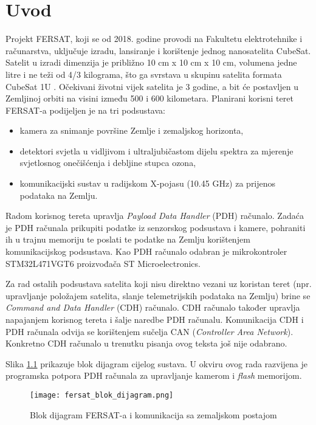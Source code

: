 \chapter{Uvod}
Projekt FERSAT, koji se od 2018. godine provodi na Fakultetu elektrotehnike i računarstva, uključuje izradu, lansiranje i korištenje jednog nanosatelita CubeSat. Satelit u izradi dimenzija je približno 10 cm x 10 cm x 10 cm, volumena jedne litre i ne teži od 4/3 kilograma, što ga svrstava u skupinu satelita formata CubeSat 1U \cite{fersat_stranica_projekta}. Očekivani životni vijek satelita je 3 godine, a bit će postavljen u Zemljinoj orbiti na visini između 500 i 600 kilometara. Planirani korisni teret  FERSAT-a podijeljen je na tri podsustava:

\begin{itemize}
	\item kamera za snimanje površine Zemlje i zemaljskog horizonta,
	\item detektori svjetla u vidljivom i ultraljubičastom dijelu spektra za mjerenje svjetlosnog onečišćenja i debljine stupca ozona,
	\item komunikacijski sustav u radijskom X-pojasu (10.45 GHz) za prijenos podataka na Zemlju.
\end{itemize}

Radom korisnog tereta upravlja \textit{Payload Data Handler} (PDH) računalo. Zadaća je PDH računala prikupiti podatke iz senzorskog podsustava i kamere, pohraniti ih u trajnu memoriju  te poslati te podatke na Zemlju korištenjem komunikacijskog podsustava. Kao PDH računalo odabran je mikrokontroler STM32L471VGT6 proizvođača ST Microelectronics.

Za rad ostalih podsustava satelita koji nisu direktno vezani uz koristan teret (npr. upravljanje položajem satelita, slanje telemetrijskih podataka na Zemlju) brine se \textit{Command and Data Handler} (CDH) računalo. CDH računalo također upravlja napajanjem korisnog tereta i šalje naredbe PDH računalu. Komunikacija CDH i PDH računala odvija se korištenjem sučelja CAN (\textit{Controller Area Network}). Konkretno CDH računalo u trenutku pisanja ovog teksta još nije odabrano.
    
Slika \ref{fig:fersat_blok} prikazuje blok dijagram cijelog sustava. U okviru ovog rada razvijena je programska potpora PDH računala za upravljanje kamerom i \textit{flash} memorijom.

\begin{figure}[H]
	\centering
	\texttt{[image: fersat\_blok\_dijagram.png]}
	\caption{Blok dijagram FERSAT-a i komunikacija sa zemaljskom postajom \cite{diplomski_goran_petrak}}
	\label{fig:fersat_blok}
\end{figure}

